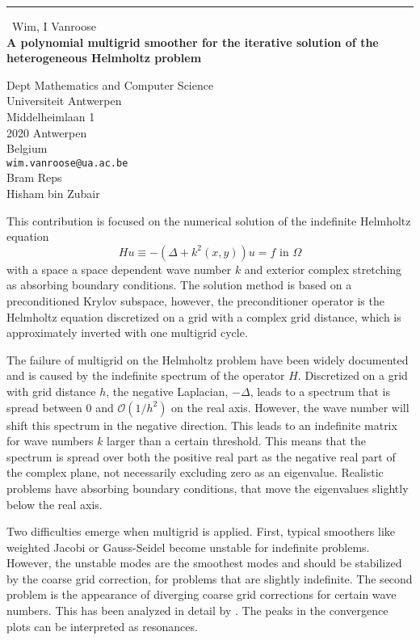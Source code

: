 \documentclass{report}
\begin{document}
\begin{center}
\rule{6in}{1pt} \
{\large Wim, I Vanroose \\
{\bf A polynomial multigrid smoother for the iterative solution of the heterogeneous Helmholtz problem}}

Dept Mathematics and Computer Science \\ Universiteit Antwerpen \\ Middelheimlaan 1 \\ 2020 Antwerpen \\ Belgium
\\
{\tt wim.vanroose@ua.ac.be}\\
Bram Reps\\
Hisham bin Zubair\end{center}


This contribution is focused on the numerical solution of the
indefinite Helmholtz equation
\begin{equation}\label{eq:helmholtz}
Hu \equiv -(\Delta+k^2(x,y))u= f \mbox{ in } \Omega
\end{equation}
with a space a space dependent wave number $k$ and exterior complex
stretching as absorbing boundary conditions. The solution method is
based on a preconditioned Krylov subspace, however, the preconditioner
operator is the Helmholtz equation discretized on a grid with a
complex grid distance, which is approximately inverted with one
multigrid cycle.

The failure of multigrid on the Helmholtz problem have been widely
documented and is caused by the indefinite spectrum of the operator
$H$. Discretized on a grid with grid distance $h$, the negative
Laplacian, $-\Delta$, leads to a spectrum that is spread between $0$ and
$\mathcal{O}(1/h^2)$ on the real axis. However, the wave number will
shift this spectrum in the negative direction. This leads to an
indefinite matrix for wave numbers $k$ larger than a certain
threshold. This means that the spectrum is spread over both the
positive real part as the negative real part of the complex plane, not
necessarily excluding zero as an eigenvalue. Realistic problems have
absorbing boundary conditions, that move the eigenvalues slightly below
the real axis.

Two difficulties emerge when multigrid is applied. First, typical
smoothers like weighted Jacobi or Gauss-Seidel become unstable for
indefinite problems. However, the unstable modes are the smoothest
modes and should be stabilized by the coarse grid correction, for
problems that are slightly indefinite. The second problem is the
appearance of diverging coarse grid corrections for certain wave
numbers. This has been analyzed in detail by \cite{elman}. The peaks
in the convergence plots can be interpreted as resonances.
\end{document}
